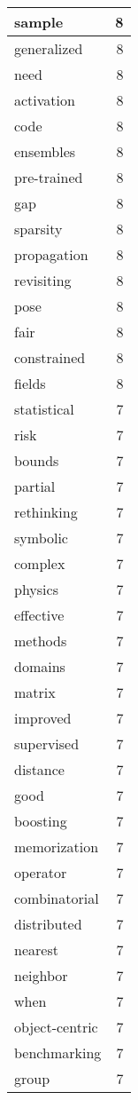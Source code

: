 \begin{table}[h]
\begin{tabular}{|l|r|}
\hline
sample & 8 \\
\hline
generalized & 8 \\
\hline
need & 8 \\
\hline
activation & 8 \\
\hline
code & 8 \\
\hline
ensembles & 8 \\
\hline
pre-trained & 8 \\
\hline
gap & 8 \\
\hline
sparsity & 8 \\
\hline
propagation & 8 \\
\hline
revisiting & 8 \\
\hline
pose & 8 \\
\hline
fair & 8 \\
\hline
constrained & 8 \\
\hline
fields & 8 \\
\hline
statistical & 7 \\
\hline
risk & 7 \\
\hline
bounds & 7 \\
\hline
partial & 7 \\
\hline
rethinking & 7 \\
\hline
symbolic & 7 \\
\hline
complex & 7 \\
\hline
physics & 7 \\
\hline
effective & 7 \\
\hline
methods & 7 \\
\hline
domains & 7 \\
\hline
matrix & 7 \\
\hline
improved & 7 \\
\hline
supervised & 7 \\
\hline
distance & 7 \\
\hline
good & 7 \\
\hline
boosting & 7 \\
\hline
memorization & 7 \\
\hline
operator & 7 \\
\hline
combinatorial & 7 \\
\hline
distributed & 7 \\
\hline
nearest & 7 \\
\hline
neighbor & 7 \\
\hline
when & 7 \\
\hline
object-centric & 7 \\
\hline
benchmarking & 7 \\
\hline
group & 7 \\

\end{tabular}
\end{table}
